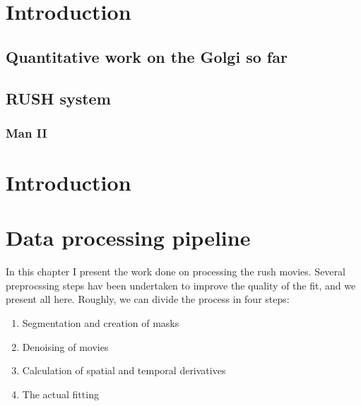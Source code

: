 \documentclass[12pt,a4paper,]{harvard-thesis}
\providecommand{\tightlist}{%
  \setlength{\itemsep}{0pt}\setlength{\parskip}{0pt}}
\begin{document}
\setcounter{page}{1}
\newpage
{}

\tableofcontents

\newpage

\hypertarget{introduction}{%
\chapter{Introduction}\label{introduction}}

\hypertarget{quantitative-work-on-the-golgi-so-far}{%
\section{Quantitative work on the Golgi so
far}\label{quantitative-work-on-the-golgi-so-far}}

\hypertarget{rush-system}{%
\section{RUSH system}\label{rush-system}}

\hypertarget{man-ii}{%
\subsection{Man II}\label{man-ii}}

\hypertarget{introduction-1}{%
\chapter{Introduction}\label{introduction-1}}

\hypertarget{data-processing-pipeline}{%
\chapter{Data processing pipeline}\label{data-processing-pipeline}}

In this chapter I present the work done on processing the rush movies.
Several preprocssing steps hav been undertaken to improve the quality of
the fit, and we present all here. Roughly, we can divide the process in
four steps:

\begin{enumerate}
\def\labelenumi{\arabic{enumi}.}
\tightlist
\item
  Segmentation and creation of masks
\item
  Denoising of movies
\item
  Calculation of spatial and temporal derivatives
\item
  The actual fitting
\end{enumerate}
\end{document}
